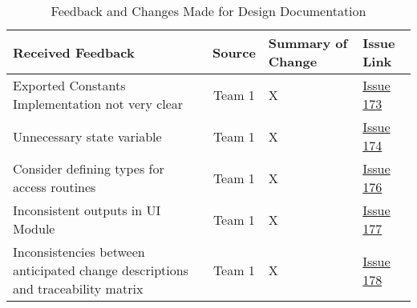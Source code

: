 \documentclass{article}
\begin{document}
\begin{table}[H]
\centering
\begin{tabularx}{\textwidth}{|X|c|X|p{1.5cm}|}
    \hline
    \textbf{Received Feedback} & \textbf{Source} & \textbf{Summary of Change}
    & \textbf{Issue Link} \\
    \hline
    Exported Constants Implementation not very clear & Team 1 & X &
    \href{https://github.com/SumanyaG/Alkalytics/issues/173}{Issue 173} \\
    \hline
    Unnecessary state variable & Team 1 & X
    &\href{https://github.com/SumanyaG/Alkalytics/issues/174}{Issue 174} \\
    \hline
    Consider defining types for access routines & Team 1 & X &
    \href{https://github.com/SumanyaG/Alkalytics/issues/176}{Issue 176} \\
    \hline
    Inconsistent outputs in UI Module & Team 1 & X &
    \href{https://github.com/SumanyaG/Alkalytics/issues/177}{Issue 177} \\
    \hline
    Inconsistencies between anticipated change descriptions and traceability
    matrix & Team 1 & X &
    \href{https://github.com/SumanyaG/Alkalytics/issues/178}{Issue 178} \\
    \hline
\end{tabularx}
\caption{Feedback and Changes Made for Design Documentation}
\label{table:Design2}
\end{table}
\end{document}
